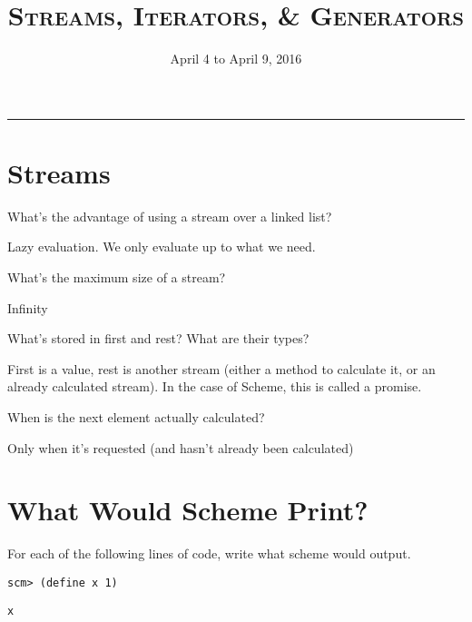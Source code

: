 \documentclass{exam}
\title{\textsc{Streams, Iterators, & Generators}}
\date{April 4 to April 9, 2016}
\begin{document}
\maketitle
\rule{\textwidth}{0.15em}
\fontsize{12}{15}\selectfont




\section{Streams}
\begin{questions}
\begin{blocksection}
\question What’s the advantage of using a stream over a linked list?
\begin{solution}[0.2in] 
Lazy evaluation. We only evaluate up to what we need.
\end{solution}

\question What’s the maximum size of a stream?
\begin{solution}[0.2in]
Infinity
\end{solution}

\question What’s stored in first and rest? What are their types? 
\begin{solution}[0.2in]
First is a value, rest is another stream (either a method to calculate it, or an already calculated stream). In the case of Scheme, this is called a promise.
\end{solution}

\question When is the next element actually calculated?
\begin{solution}[.2in]
Only when it's requested (and hasn't already been calculated)
\end{solution}
\end{blocksection}

\section{What Would Scheme Print?}
\begin{blocksection}
\question For each of the following lines of code, write what scheme would output.

\begin{lstlisting}
scm> (define x 1)
\end{lstlisting}
\begin{solution}[.25in]
\texttt{x}
\end{solution}


\end{blocksection}
\end{questions}
\end{document}

